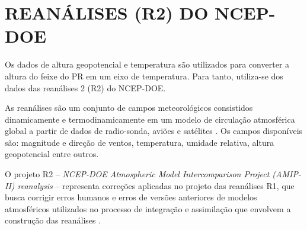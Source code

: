 



\section{REANÁLISES (R2) DO NCEP-DOE}

Os dados de altura geopotencial e temperatura são utilizados para converter a altura do feixe do PR em um eixo de temperatura. Para tanto, utiliza-se dos dados das reanálises 2 (R2) do NCEP-DOE.   

As reanálises são um conjunto de campos meteorológicos  consistidos dinamicamente e termodinamicamente em um modelo de circulação atmosférica global a partir de dados de radio-sonda, aviões e satélites \cite{kalnay1996ncep}. Os campos disponíveis são: magnitude e direção de ventos, temperatura, umidade relativa, altura geopotencial entre outros.

O projeto R2  -- \textit{NCEP-DOE Atmospheric Model Intercomparison Project (AMIP-II) reanalysis} -- representa correções aplicadas no projeto das reanálises R1, que busca corrigir erros humanos e erros de versões anteriores de modelos atmosféricos utilizados no processo de integração e assimilação que envolvem a construção das reanálises \cite{kanamitsu}.



